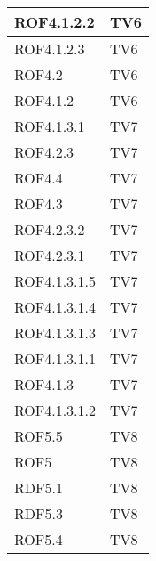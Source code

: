 \begin{center}
\begin{longtable}{|p{7cm}|p{7cm}|}
\midrule
ROF4.1.2.2
& TV6\\

\midrule
ROF4.1.2.3
& TV6\\

\midrule
ROF4.2
& TV6\\

\midrule
ROF4.1.2
& TV6\\

\midrule
ROF4.1.3.1
& TV7\\

\midrule
ROF4.2.3
& TV7\\

\midrule
ROF4.4
& TV7\\

\midrule
ROF4.3
& TV7\\

\midrule
ROF4.2.3.2
& TV7\\

\midrule
ROF4.2.3.1
& TV7\\

\midrule
ROF4.1.3.1.5
& TV7\\

\midrule
ROF4.1.3.1.4
& TV7\\

\midrule
ROF4.1.3.1.3
& TV7\\

\midrule
ROF4.1.3.1.1
& TV7\\

\midrule
ROF4.1.3
& TV7\\

\midrule
ROF4.1.3.1.2
& TV7\\

\midrule
ROF5.5
& TV8\\

\midrule
ROF5
& TV8\\

\midrule
RDF5.1
& TV8\\

\midrule
RDF5.3
& TV8\\

\midrule
ROF5.4
& TV8\\

\end{longtable}
\end{center}


